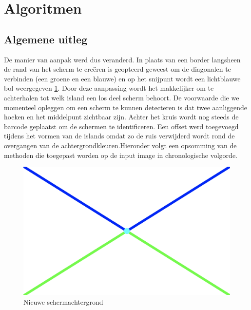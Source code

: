 \section{Algoritmen}
\subsection{Algemene uitleg}
De manier van aanpak werd dus veranderd. In plaats van een border langsheen de rand van het scherm te creëren is geopteerd geweest om de diagonalen te verbinden (een groene en een blauwe) en op het snijpunt wordt een lichtblauwe bol weergegeven \ref{fig:screen}. Door deze aanpassing wordt het makkelijker om te achterhalen tot welk island een los deel scherm behoort. De voorwaarde die we momenteel opleggen om een scherm te kunnen detecteren is dat twee aanliggende hoeken en het middelpunt zichtbaar zijn. Achter het kruis wordt nog steeds de barcode geplaatst om de schermen te identificeren.
Een offset werd toegevoegd tijdens het vormen van de islands omdat zo de ruis verwijderd wordt rond de overgangen van de achtergrondkleuren.Hieronder volgt een opsomming van de methoden die toegepast worden op de input image in chronologische volgorde.
\center
\begin{figure} [h]
	\includegraphics[width=\textwidth]{screen}
	\caption{Nieuwe schermachtergrond}
	\label{fig:screen}
\end{figure}

